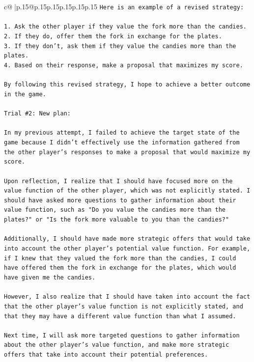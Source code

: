\documentclass{article}
\begin{document}
{\begin{supertabular}{c@{$\;$}|p{.15\linewidth}@{}p{.15\linewidth}p{.15\linewidth}p{.15\linewidth}p{.15\linewidth}p{.15\linewidth}}
{{{\texttt{Here is an example of a revised strategy:} \\
\\ 
\texttt{1. Ask the other player if they value the fork more than the candies.} \\
\texttt{2. If they do, offer them the fork in exchange for the plates.} \\
\texttt{3. If they don't, ask them if they value the candies more than the plates.} \\
\texttt{4. Based on their response, make a proposal that maximizes my score.} \\
\\ 
\texttt{By following this revised strategy, I hope to achieve a better outcome in the game.} \\
\\ 
\texttt{Trial \#2: New plan: } \\
\\ 
\texttt{In my previous attempt, I failed to achieve the target state of the game because I didn't effectively use the information gathered from the other player's responses to make a proposal that would maximize my score. } \\
\\ 
\texttt{Upon reflection, I realize that I should have focused more on the value function of the other player, which was not explicitly stated. I should have asked more questions to gather information about their value function, such as "Do you value the candies more than the plates?" or "Is the fork more valuable to you than the candies?" } \\
\\ 
\texttt{Additionally, I should have made more strategic offers that would take into account the other player's potential value function. For example, if I knew that they valued the fork more than the candies, I could have offered them the fork in exchange for the plates, which would have given me the candies.} \\
\\ 
\texttt{However, I also realize that I should have taken into account the fact that the other player's value function is not explicitly stated, and that they may have a different value function than what I assumed. } \\
\\ 
\texttt{Next time, I will ask more targeted questions to gather information about the other player's value function, and make more strategic offers that take into account their potential preferences. } \\
}}}
\end{supertabular}}
\end{document}
